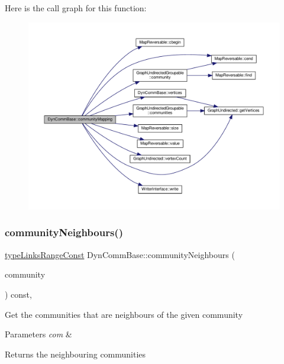 Here is the call graph for this function\+:
\nopagebreak
\begin{figure}[H]
\begin{center}
\leavevmode
\includegraphics[width=350pt]{classDynCommBase_a75ed5e0546d756a3b327f41e292620b2_cgraph}
\end{center}
\end{figure}
\mbox{\label{classDynCommBase_aba6f1f0fdd67a1d7f546d63706a60cde}} 
\subsubsection{\texorpdfstring{community\+Neighbours()}{communityNeighbours()}}
{\footnotesize\ttfamily \hyperlink{graphInterface_8h_ae8d27008f15586bbf419af7ad2e0a48a}{type\+Links\+Range\+Const} Dyn\+Comm\+Base\+::community\+Neighbours (\begin{DoxyParamCaption}\item[{\hyperlink{graphUndirectedGroupable_8h_a914da95c9ea7f14f4b7f875c36818556}{type\+Community}}]{community }\end{DoxyParamCaption}) const\hspace{0.3cm}{\ttfamily [inline]}, {\ttfamily [virtual]}}

Get the communities that are neighbours of the given community


\begin{DoxyParams}{Parameters}
{\em com} & \\
\hline
\end{DoxyParams}
\begin{DoxyReturn}{Returns}
the neighbouring communities 
\end{DoxyReturn}


